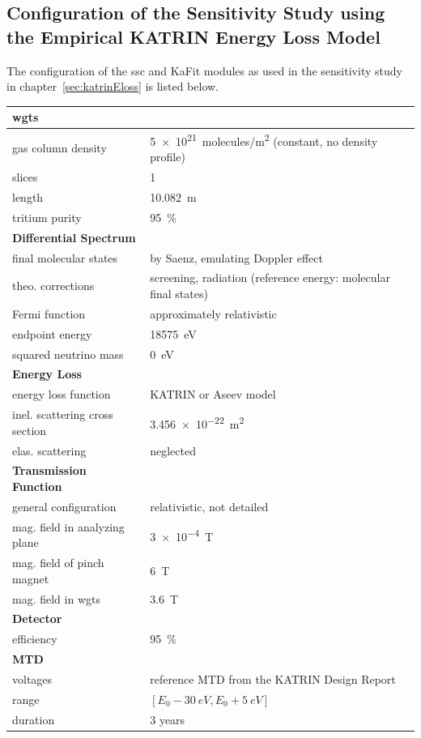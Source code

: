 \begin{samepage}
\section{Configuration of the Sensitivity Study using the Empirical KATRIN Energy Loss Model}
\label{sec:appendixKatrinElossSSCConfig}
The configuration of the \gls{ssc} and KaFit modules as used in the sensitivity study in chapter~\ref{sec:katrinEloss} is listed below.

\newcommand{\myModelConfigTableStrut}{\rule{0pt}{4ex}}
\begin{tabular}{ll}
	\toprule
	\textbf{\gls{wgts}} & \\
	\midrule
	gas column density & \SI{5e21}{molecules/m^2} (constant, no density profile) \\
	slices & 1 \\
	length & \SI{10.082}{m} \\
	tritium purity & \SI{95}{\percent} \\
	\myModelConfigTableStrut
	\textbf{Differential Spectrum} & \\
	\midrule
	final molecular states & by Saenz, emulating Doppler effect \\
	theo. corrections & screening, radiation (reference energy: molecular final states) \\
	Fermi function & approximately relativistic \\
	endpoint energy & \SI{18575}{eV} \\
	squared neutrino mass & \SI{0}{eV} \\
	\myModelConfigTableStrut
	\textbf{Energy Loss} & \\
	\midrule
	energy loss function & KATRIN or Aseev model \\
	inel. scattering cross section & \SI{3.456e-22}{m^2} \\
	elas. scattering & neglected \\
	\myModelConfigTableStrut
	\textbf{Transmission Function} & \\
	\midrule
	general configuration & relativistic, not detailed \\
	mag. field in analyzing plane & \SI{3e-4}{T} \\
	mag. field of pinch magnet & \SI{6}{T} \\
	mag. field in \gls{wgts} & \SI{3.6}{T} \\
	\myModelConfigTableStrut
	\textbf{Detector} & \\
	\midrule
	efficiency & \SI{95}{\percent} \\
	\myModelConfigTableStrut
	\textbf{MTD} & \\
	\midrule
	voltages & reference MTD from the KATRIN Design Report \\
	range & $[E_0-\SI{30}{eV},E_0+\SI{5}{eV}]$ \\
	duration & 3 years \\
	\bottomrule
\end{tabular}
\end{samepage}